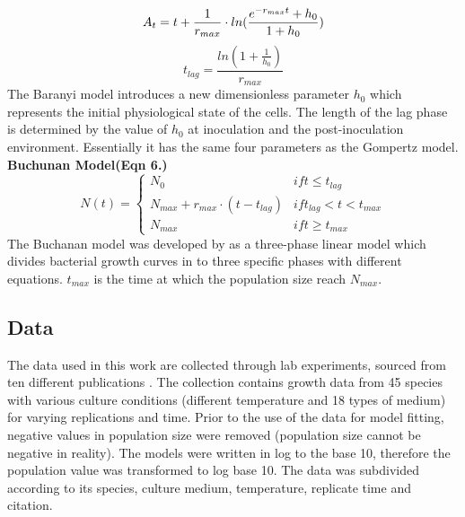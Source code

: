 \documentclass[a4paper,11pt]{article}
\theoremstyle{definition}
\begin{document}
\begin{equation}
    A_t = t + \frac{1}{r_{max}}\cdot ln(\frac{e^{-r_{max}t}+h_0}{1+h_0})\\
\end{equation}
\begin{equation}
    t_{lag} = \frac{ln(1+\frac{1}{h_0})}{r_{max}}
\end{equation}
The Baranyi model introduces a new dimensionless parameter $h_0$ which represents the initial physiological state of the cells. The length of the lag phase is determined by the value of $h_0$ at inoculation and the post-inoculation environment. Essentially it has the same four parameters as the Gompertz model.\\
\textbf{Buchunan Model(Eqn 6.)}
\begin{equation}
    N(t)=\left\{\begin{matrix}
N_0 & if  t\leq t_{lag} \\ N_{max} + r_{max}\cdot (t-t_{lag})
 & if t_{lag} < t < t_{max} \\N_{max}
 & if t\geq t_{max} 
\end{matrix}\right.
\end{equation}
The Buchanan model was developed by \citealp{buchanan1997simple} as a three-phase linear model which divides bacterial growth curves in to three specific phases with different equations. $t_{max}$ is the time at which the population size reach $N_{max}$.
\subsection{Data}
The data used in this work are collected through lab experiments, sourced from ten different publications \citep{bae2014growth,bernhardt2018metabolic,galarz2016predicting,gill1991growth,phillips1987relation,roth1962continuity,silva2018modelling,sivonen1990effects, stannard1985temperature,zwietering1994modeling}. The collection contains growth data from 45 species with various culture conditions (different temperature and 18 types of medium) for varying replications and time. Prior to the use of the data for model fitting, negative values in population size were removed (population size cannot be negative in reality). The models were written in log to the base 10, therefore the population value was transformed to log base 10. The data was subdivided according to its species, culture medium, temperature, replicate time and citation.
\end{document}

